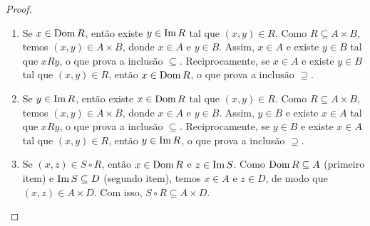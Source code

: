 \begin{proof}
    \leavevmode
        \begin{enumerate}[leftmargin=*, align=left, label=\textbf{(\alph*)}]
            \item Se $x \in \operatorname{Dom} R$, então existe $y \in \operatorname{Im} R$ tal que $(x,y) \in R$. Como $R \subseteq A \times B$, temos $(x,y) \in A \times B$, donde $x \in A$ e $y \in B$. Assim, $x \in A$ e existe $y \in B$ tal que $xRy$, o que prova a inclusão $\subseteq$. Reciprocamente, se $x \in A$ e existe $y \in B$ tal que $(x,y) \in R$, então $x \in \operatorname{Dom} R$, o que prova a inclusão $\supseteq$. \blackproof
            \item Se $y \in \operatorname{Im} R$, então existe $x \in \operatorname{Dom} R$ tal que $(x,y) \in R$. Como $R \subseteq A \times B$, temos $(x,y) \in A \times B$, donde $x \in A$ e $y \in B$. Assim, $y \in B$ e existe $x \in A$ tal que $xRy$, o que prova a inclusão $\subseteq$. Reciprocamente, se $y \in B$ e existe $x \in A$ tal que $(x,y) \in R$, então $y \in \operatorname{Im} R$, o que prova a inclusão $\supseteq$. \blackproof
            \item Se $(x,z) \in S \circ R$, então $x \in \operatorname{Dom} R$ e $z \in \operatorname{Im} S$. Como $\operatorname{Dom} R \subseteq A$ (primeiro item) e $\operatorname{Im} S \subseteq D$ (segundo item), temos $x \in A$ e $z \in D$, de modo que $(x,z) \in A \times D$. Com isso, $S \circ R \subseteq A \times D$. \blackproof
        \end{enumerate}
\end{proof}

